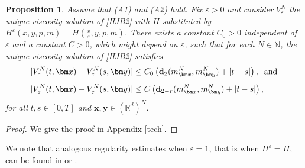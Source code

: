 \documentclass[reqno,11pt]{amsart}
\newtheorem{proposition}[theorem]{Proposition}
\numberwithin{equation}{section}
\newcommand{\R}{\mathbb{R}} %
\newcommand{\e}{\varepsilon}
\newcommand{\nd}{\noindent}
\begin{document}
\begin{proposition}\label{Nregularity}
Assume that (A1) and (A2) hold. Fix $\e>0$ and consider $V^{N}_\e$ the unique viscosity solution of \eqref{HJB2} with  $H$ substituted by $H^\e(x,y,p,m)=H\left(\frac{x}{\e},y,p,m\right)$. There exists a constant $C_0>0$ independent of $\e$ and a constant $C>0$, which might depend on $\e$,  such that for each $N\in \mathbb{N}$, the unique viscosity solution of \eqref{HJB2} satisfies
\begin{align}
&|V^N_\e(t,\bm x)- V^N_\e(s,\bm y)|\le C_0\left( {\bf d}_{2}(m_{\bm x}^N,m_{\bm y}^N)+|t-s|\right),\;\;\text{and}\label{epsilonunifinorm}\\[1ex]
&|V^N_\e(t,\bm x)- V^N_\e(s,\bm y)|\le C\left( {\bf d}_{2-r}(m_{\bm x}^N,m_{\bm y}^N)+|t-s|\right)\label{notuniform},
\end{align}
for all $t,s\in[0,T]$ and $\bm x,\bm y\in (\R^d)^N$.
\end{proposition}

\begin{proof}
    We give the proof in Appendix \ref{tech}.
\end{proof}

\nd
We note that analogous regularity estimates when $\e=1$, that is when $H^\e=H$, can be found in \cite[Theorem 3.3]{gangbo2021finite} or \cite[Proposition 2.5]{daudin2025error}.
\vspace{3mm}
\end{document}
